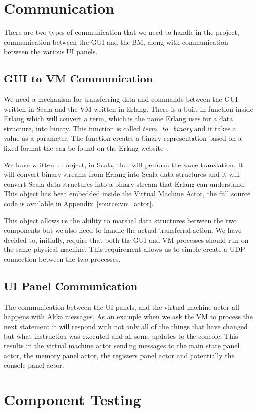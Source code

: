 \documentclass[a4paper,11pt]{report}
\begin{document}
\section{Communication}
There are two types of communication that we need to handle in the project, communication between the GUI and the BM, along with communication between the various UI panels.
\subsection{GUI to VM Communication}
We need a mechanism for transferring data and commands between the GUI written in Scala and the VM written in Erlang. There is a built in function inside Erlang which will convert a term, which is the name Erlang uses for a data structure, into binary. This function is called \textit{term\_to\_binary} and it takes a value as a parameter. The function creates a binary representation based on a fixed format the can be found on the Erlang website~\cite{term_to_binary}.

We have written an object, in Scala, that will perform the same translation. It will convert binary streams from Erlang into Scala data structures and it will convert Scala data structures into a binary stream that Erlang can understand. This object has been embedded inside the Virtual Machine Actor, the full source code is available in Appendix~\ref{source:vm_actor}.

This object allows us the ability to marshal data structures between the two components but we also need to handle the actual transferral action. We have decided to, initially, require that both the GUI and VM processes should run on the same physical machine. This requirement allows us to simple create a UDP connection between the two processes.
\subsection{UI Panel Communication}
The communication between the UI panels, and the virtual machine actor all happens with Akka messages. As an example when we ask the VM to process the next statement it will respond with not only all of the things that have changed but what instruction was executed and all some updates to the console. This results in the virtual machine actor sending messages to the main state panel actor, the memory panel actor, the registers panel actor and potentially the console panel actor.
\section{Component Testing}
\end{document}
